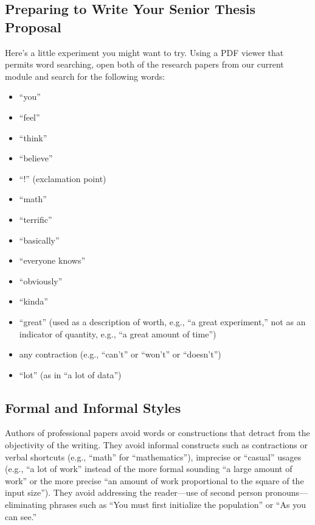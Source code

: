 
\usepackage[compact]{titlesec}




\subsection*{Preparing to Write Your Senior Thesis Proposal}

Here's a little experiment you might want to try.  Using a PDF viewer that permits word searching, open both of the 
research papers from our current module and search for the following words:

\begin{itemize}
\item
``you''
\item
``feel''
\item
``think''
\item
``believe''
\item
``!'' (exclamation point)
\item
``math''
\item
``terrific''
\item ``basically''
\item ``everyone knows''
  \item ``obviously''
    \item ``kinda''
\item
``great'' (used as a description of worth, e.g., ``a great experiment,'' not
as an indicator of quantity, e.g., ``a great amount of time'')
\item
any contraction (e.g., ``can't'' or ``won't'' or ``doesn't'')
\item
``lot'' (as in ``a lot of data'')


\end{itemize}

\subsection*{Formal and Informal Styles}
Authors of professional papers avoid words or constructions
that detract from the objectivity of the writing. They avoid informal
constructs such as contractions or verbal shortcuts (e.g., ``math''
for ``mathematics''), imprecise or ``casual'' usages (e.g., ``a lot
of work'' instead of the more formal sounding ``a large amount
of work'' or the more precise ``an amount of work proportional to 
the square of the input size''). They avoid addressing the reader---use
of second person pronouns---eliminating phrases such as
``You must first initialize the population''
or 
``As you can see.''

